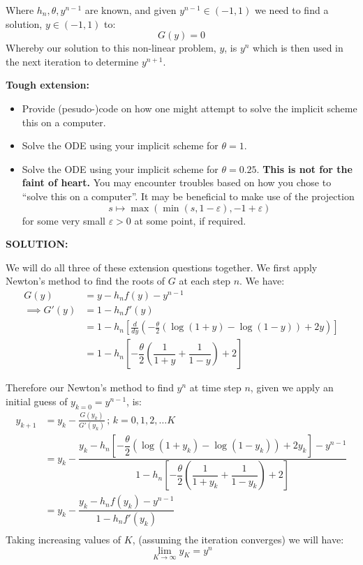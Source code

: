 \documentclass[]{article}
\begin{document}
\noindent Where $h_n, \theta, y^{n-1}$ are known, and given $y^{n-1} \in (-1,1)$ we need to find a solution, $y \in(-1,1)$ to:
\[
G(y) =0
\]
Whereby our solution to this non-linear problem, $y$, is $y^n$ which is then used in the next iteration to determine $y^{n+1}$. \newline

\noindent\textbf{Tough extension:}
\begin{itemize}
  \item Provide (pesudo-)code on how one might attempt to solve the implicit scheme this on a computer.
    \item Solve the ODE using your implicit scheme for $\theta = 1$.
  \item Solve the ODE using your implicit scheme for $\theta = 0.25$. \textbf{This is not for the faint
  of heart.} You may encounter troubles based on how you chose to ``solve this on a computer''.
  It may be beneficial to make use of the projection
  \[
    s \mapsto \max(\min(s,1-\varepsilon),-1+\varepsilon)
  \]
  for some very small $\varepsilon > 0$ at some point, if required.\\
  \end{itemize}
  \vspace{-0.3cm}
  \noindent \textbf{SOLUTION:} \newline

\noindent We will do all three of these extension questions together. We first apply Newton's method to find the roots of $G$ at each step $n$. We have:
\begin{align*}
    G(y) &= y - h_nf(y) - y^{n-1}\\[10pt]
    \implies G'(y) &= 1 - h_nf'(y)\\[4pt]
    &= 1 - h_n\left[ \frac{d}{dy}\left( -\frac{\theta}{2}\left(\log(1+y)-\log(1-y)\right)+2y \right) \right]\\[4pt]
    &= 1- h_n\left[ -\dfrac{\theta}{2}\left( \dfrac{1}{1+y} +\dfrac{1}{1-y}\right) + 2\right]
\end{align*}

\noindent Therefore our Newton's method to find $y^{n}$ at time step $n$, given we apply an initial guess of $y_{k=0} = y^{n-1}$, is:
\begin{align*}
y_{k+1} &= y_k - \frac{G(y_k)}{G'(y_k)}\,;\, k = 0,1,2,\dots K\\[3pt]
   &= y_k - \dfrac{y_k- h_n\left[ -\dfrac{\theta}{2}\left(\log(1+y_k)-\log(1-y_k)\right)+2y_k\right]  - y^{n-1}}{1- h_n\left[ -\dfrac{\theta}{2}\left( \dfrac{1}{1+y_k} +\dfrac{1}{1-y_k}\right) + 2\right]}\\[5pt]
    &= y_k - \dfrac{y_k-h_nf(y_k)-y^{n-1}}{1-h_nf'(y_k)}\\
\end{align*}
\noindent Taking increasing values of $K$, (assuming the iteration converges) we will have:
\[\displaystyle \lim_{K\to\infty} y_K = y^n\]
\end{document}
